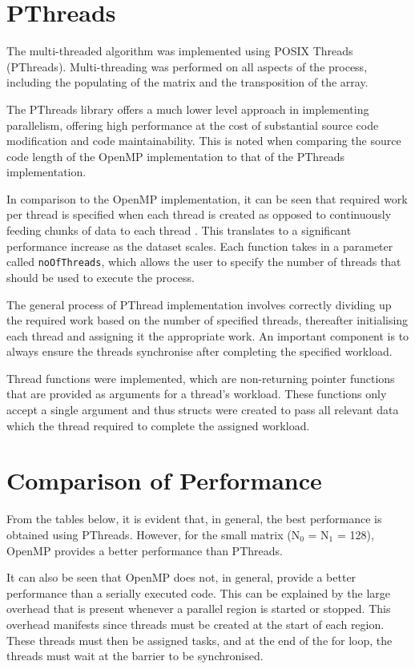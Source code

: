 \documentclass[10pt,twocolumn]{witseiepaper}
\begin{document}
\section{PThreads}
The multi-threaded algorithm was implemented using POSIX Threads (PThreads). Multi-threading was performed on all aspects of the process, including the populating of the matrix and the transposition of the array. 

The PThreads library offers a much lower level approach in implementing parallelism, offering high performance at the cost of substantial source code modification and code maintainability. This is noted when comparing the source code length of the OpenMP implementation to that of the PThreads implementation.

In comparison to the OpenMP implementation, it can be seen that required work per thread is specified when each thread is created as opposed to continuously feeding chunks of data to each thread \cite{pthread}. This translates to a significant performance increase as the dataset scales. Each function takes in a parameter called \texttt{noOfThreads}, which allows the user to specify the number of threads that should be used to execute the process.

The general process of PThread implementation involves correctly dividing up the required work based on the number of specified threads, thereafter initialising each thread and assigning it the appropriate work. An important component is to always ensure the threads synchronise after completing the specified workload.

Thread functions were implemented, which are non-returning pointer functions that are provided as arguments for a thread's workload. These functions only accept a single argument and thus structs were created to pass all relevant data which the thread required to complete the assigned workload.

\section{Comparison of Performance}
From the tables below, it is evident that, in general, the best performance is obtained using PThreads. However, for the small matrix (N$_{0}$ = N$_{1}$ = 128), OpenMP provides a better performance than PThreads. 

It can also be seen that OpenMP does not, in general, provide a better performance than a serially executed code. This can be explained by the large overhead that is present whenever a parallel region is started or stopped. This overhead manifests since threads must be created at the start of each region. These threads must then be assigned tasks, and at the end of the for loop, the threads must wait at the barrier to be synchronised.
\end{document}

